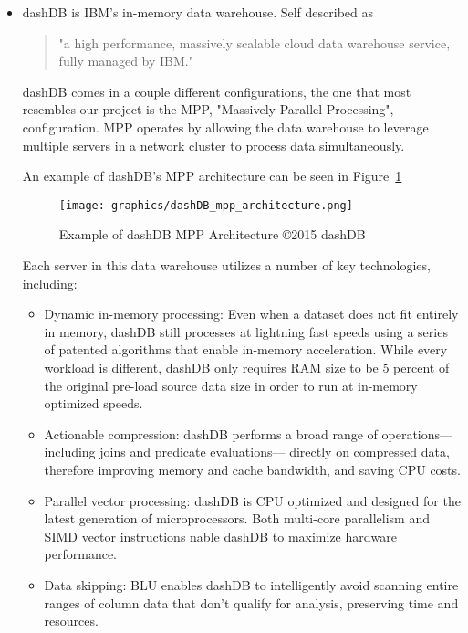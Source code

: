 \documentclass[letterpaper, 12pt]{article}
\begin{document}
\begin{itemize}
  \item dashDB is IBM's in-memory data warehouse. Self described as
  \begin{quote}
  "a high performance, massively scalable cloud data warehouse service,
  fully managed by IBM." \cite{dashDB}
  \end{quote}
  dashDB comes in a couple different configurations, the one that most resembles
  our project is the MPP, "Massively Parallel Processing", configuration.
  MPP operates by allowing the data warehouse to leverage multiple servers
  in a network cluster to process data simultaneously.
  \par\vspace{\baselineskip}
  An example of dashDB's MPP architecture can be seen in Figure~\ref{fig:dashdb_mpp}
  \begin{figure}
    \centering
    \label{fig:dashdb_mpp}
    \texttt{[image: graphics/dashDB\_mpp\_architecture.png]}
    \caption{Example of dashDB MPP Architecture \copyright 2015 dashDB \cite{dashDB}}
  \end{figure}
  \par\vspace{\baselineskip}
  Each server in this data warehouse utilizes a number of key technologies, including:
  \begin{itemize}
    \item Dynamic in-memory processing: Even when a dataset
    does not fit entirely in memory, dashDB still processes at
    lightning fast speeds using a series of patented algorithms
    that enable in-memory acceleration. While every workload
    is different, dashDB only requires RAM size to be 5 percent
    of the original pre-load source data size in order to run at
in-memory optimized speeds.
\item Actionable compression: dashDB performs a broad range
    of operations—including joins and predicate evaluations—
    directly on compressed data, therefore improving memory
    and cache bandwidth, and saving CPU costs.
   \item Parallel vector processing: dashDB is CPU optimized
   and designed for the latest generation of microprocessors.
   Both multi-core parallelism and SIMD vector instructions
nable dashDB to maximize hardware performance.
   \item Data skipping: BLU enables dashDB to intelligently avoid
   scanning entire ranges of column data that don’t qualify for
   analysis, preserving time and resources.
 \end{itemize}


\end{itemize}
\end{document}
